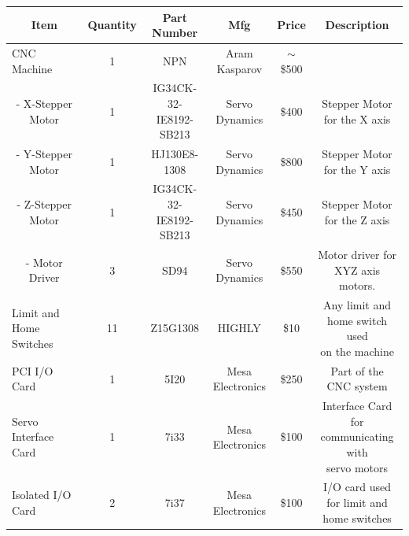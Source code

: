 \documentclass[12pt]{article}
\begin{document}
\begin{adjustwidth}{-2cm}{-2cm}

\begin{center}


\begin{tabular}{ |c|c|c|c|c|c| }


  \hline
  \textbf{Item} & \textbf{Quantity} & \thead{Part \\ Number} & \textbf{Mfg} & \textbf{Price} & \textbf{Description} \\  \hline
  \multicolumn{1}{|l|}{CNC Machine} & 1 & NPN & \makecell{Aram \\ Kasparov} & $\sim$\$500 &  \\ \hline 
  - X-Stepper Motor & 1 & \makecell{IG34CK-32-\\IE8192-SB213} & \makecell{Servo \\ Dynamics} & \$400 & \makecell{Stepper Motor \\ for the X axis}  \\ \hline
  - Y-Stepper Motor & 1 & HJ130E8-1308 & \makecell{Servo \\ Dynamics} & \$800 & \makecell{Stepper Motor \\ for the Y axis}  \\ \hline
  - Z-Stepper Motor & 1 & \makecell{IG34CK-32-\\IE8192-SB213} & \makecell{Servo \\ Dynamics} & \$450 & \makecell{Stepper Motor \\ for the Z axis} \\ \hline
  - Motor Driver & 3 & SD94 & \makecell{Servo \\ Dynamics} & \$550 & \makecell{Motor driver for \\ XYZ axis motors.} \\ \hline \hline
  
  
  \multicolumn{1}{|l|}{Limit and Home Switches} & 11 & Z15G1308 & HIGHLY & \$10 & \makecell{Any limit and \\ home switch used \\ on the machine}  \\ \hline
 
  \multicolumn{1}{|l|}{PCI I/O Card} & 1 & 5I20 & \makecell{Mesa \\ Electronics} & \$250 & \makecell{Part of the \\ CNC system}   \\ \hline
  \multicolumn{1}{|l|}{Servo Interface Card} & 1 & 7i33 & \makecell{Mesa \\ Electronics} & \$100 & \makecell{Interface Card for \\ communicating with \\ servo motors}
   \\ \hline
  \multicolumn{1}{|l|}{Isolated I/O Card} & 2 & 7i37 & \makecell{Mesa \\ Electronics} & \$100 & \makecell{I/O card used \\ for limit and \\ home switches}
  \\ \hline \hline
  

\end{tabular}
\end{center}
\end{adjustwidth}
\end{document}
